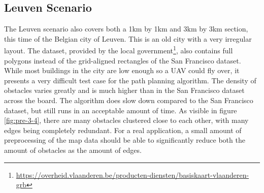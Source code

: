 \subsection{Leuven Scenario}
The Leuven scenario also covers both a 1km by 1km and 3km by 3km section, this time of the Belgian city of Leuven. This is an old city with a very irregular layout. The dataset, provided by the local government\footnote{\url{https://overheid.vlaanderen.be/producten-diensten/basiskaart-vlaanderen-grb}}, also contains full polygons instead of the grid-aligned rectangles of the San Francisco dataset. While most buildings in the city are low enough so a UAV could fly over, it presents a very difficult test case for the path planning algorithm. The density of obstacles varies greatly and is much higher than in the San Francisco dataset across the board. The algorithm does slow down compared to the San Francisco dataset, but still runs in an acceptable amount of time. As visible in figure \ref{fig:pre-3-4}, there are many obstacles clustered close to each other, with many edges being completely redundant. For a real application, a small amount of preprocessing of the map data should be able to significantly reduce both the amount of obstacles as the amount of edges. 

